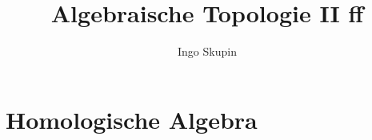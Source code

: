 \documentclass[parskip=half,a4paper]{scrartcl}
\title{Algebraische Topologie II ff}
\author{Ingo Skupin}
\theoremstyle{default}
\begin{document}
\maketitle

\clearpage


\setcounter{section}{8}
\section{Homologische Algebra}




\end{document}
